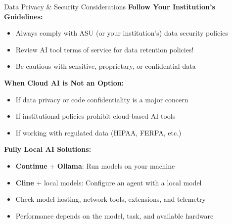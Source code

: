 \documentclass[11pt,aspectratio=169]{beamer}
\begin{document}
\begin{frame}{Data Privacy \& Security Considerations}
\textbf{Follow Your Institution's Guidelines:}
\begin{itemize}
    \item Always comply with ASU (or your institution's) data security policies
    \item Review AI tool terms of service for data retention policies!
    \item Be cautious with sensitive, proprietary, or confidential data
\end{itemize}

\vspace{0.3cm}

\textbf{When Cloud AI is Not an Option:}
\begin{itemize}
    \item If data privacy or code confidentiality is a major concern
    \item If institutional policies prohibit cloud-based AI tools
    \item If working with regulated data (HIPAA, FERPA, etc.)
\end{itemize}

\vspace{0.3cm}

\textbf{Fully Local AI Solutions:}
\begin{itemize}
    \item \textbf{Continue} + \textbf{Ollama}: Run models on your machine
    \item \textbf{Cline} + local models: Configure an agent with a local model
    \item Check model hosting, network tools, extensions, and telemetry
    \item Performance depends on the model, task, and available hardware
\end{itemize}
\end{frame}
\end{document}
